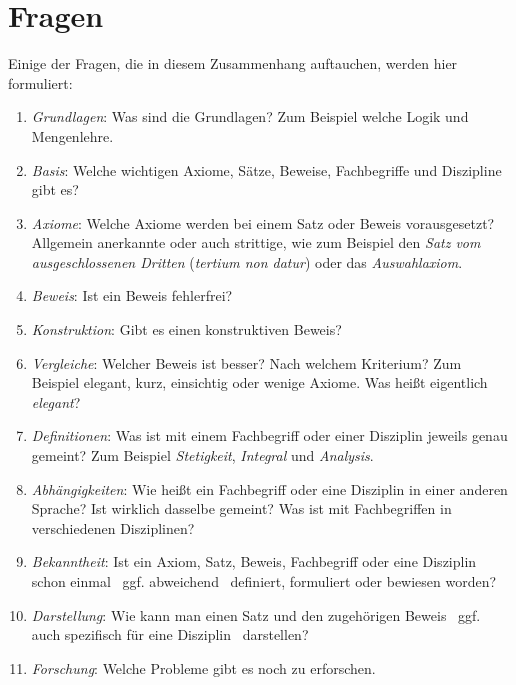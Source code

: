 \documentclass[english,ngerman,parskip=half,headsepline,footsepline]{scrreprt}
\begin{document}
	\section{Fragen}
	\label{sec:Fragen}
	Einige der Fragen, die in diesem Zusammenhang auftauchen, werden hier formuliert:
	
	\begin{enumerate}
		
		\item \label{Frage:Grundlagen} \emph{Grundlagen}: Was sind die Grundlagen? Zum Beispiel welche Logik und Mengenlehre.
		
		\item \label{Frage:Basis} \emph{Basis}: Welche wichtigen Axiome, Sätze, Beweise, Fachbegriffe und Diszipline gibt es?
		
		\item \label{Frage:Axiome} \emph{Axiome}: Welche Axiome werden bei einem Satz oder Beweis vorausgesetzt? Allgemein anerkannte oder auch strittige, wie zum Beispiel den \emph{Satz vom ausgeschlossenen Dritten} (\emph{tertium non datur}) oder das \emph{Auswahlaxiom}.
		
		\item \label{Frage:Beweis} \emph{Beweis}: Ist ein Beweis fehlerfrei?
		
		\item \label{Frage:Konstruktion} \emph{Konstruktion}: Gibt es einen konstruktiven Beweis?
		
		\item \label{Frage:Vergleiche} \emph{Vergleiche}: Welcher Beweis ist besser? Nach welchem Kriterium? Zum Beispiel elegant, kurz, einsichtig oder wenige Axiome. Was heißt eigentlich \emph{elegant}?
		
		\item \label{Frage:Definitionen} \emph{Definitionen}: Was ist mit einem Fachbegriff oder einer Disziplin jeweils genau gemeint? Zum Beispiel \emph{Stetigkeit}, \emph{Integral} und \emph{Analysis}.
		
		\item \label{Frage:Abhängigkeiten} \emph{Abhängigkeiten}: Wie heißt ein Fachbegriff oder eine Disziplin in einer anderen Sprache? Ist wirklich dasselbe gemeint? Was ist mit Fachbegriffen in verschiedenen Disziplinen?
		
		\item \label{Frage:Bekanntheit} \emph{Bekanntheit}: Ist ein Axiom, Satz, Beweis, Fachbegriff oder eine Disziplin schon einmal \textendash\ ggf. abweichend \textendash\ definiert, formuliert oder bewiesen worden?
		
		\item \label{Frage:Darstellung} \emph{Darstellung}: Wie kann man einen Satz und den zugehörigen Beweis \textendash\ ggf. auch spezifisch für eine Disziplin \textendash\ darstellen?
		
		\item \label{Frage:Forschung} \emph{Forschung}: Welche Probleme gibt es noch zu erforschen.
		
	\end{enumerate}
	
\end{document}
